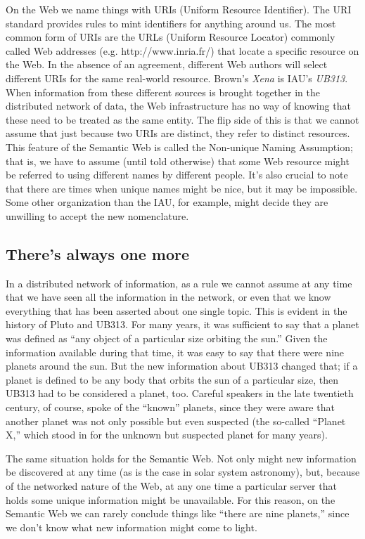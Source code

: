 On the Web we name things with URIs (Uniform Resource Identifier). The
URI standard provides rules to mint identifiers for anything around us.
The most common form of URIs are the URLs (Uniform Resource Locator)
commonly called Web addresses (e.g. http://www.inria.fr/) that locate a
specific resource on the Web. In the absence of an agreement, different
Web authors will select different URIs for the same real-world resource.
Brown's \emph{Xena} is IAU's \emph{UB313}. When information from these
different sources is brought together in the distributed network of
data, the Web infrastructure has no way of knowing that these need to be
treated as the same entity. The flip side of this is that we cannot
assume that just because two URIs are distinct, they refer to distinct
resources. This feature of the Semantic Web is called the Non-unique
Naming Assumption; that is, we have to assume (until told otherwise)
that some Web resource might be referred to using different names by
different people. It's also crucial to note that there are times when
unique names might be nice, but it may be impossible. Some other
organization than the IAU, for example, might decide they are unwilling
to accept the new nomenclature.

\subsection{There's always one more}
\label{openworld}

In a distributed network of information, as a rule we cannot assume at
any time that we have seen all the information in the network, or even
that we know everything that has been asserted about one single topic.
This is evident in the history of Pluto and UB313. For many years, it
was sufficient to say that a planet was defined as ``any object of a
particular size orbiting the sun.'' Given the information available
during that time, it was easy to say that there were nine planets around
the sun. But the new information about UB313 changed that; if a planet
is defined to be any body that orbits the sun of a particular size, then
UB313 had to be considered a planet, too. Careful speakers in the late
twentieth century, of course, spoke of the ``known'' planets, since they
were aware that another planet was not only possible but even suspected
(the so-called ``Planet X,'' which stood in for the unknown but
suspected planet for many years).

The same situation holds for the Semantic Web. Not only might new
information be discovered at any time (as is the case in solar system
astronomy), but, because of the networked nature of the Web, at any one
time a particular server that holds some unique information might be
unavailable. For this reason, on the Semantic Web we can rarely conclude
things like ``there are nine planets,'' since we don't know what new
information might come to light.

